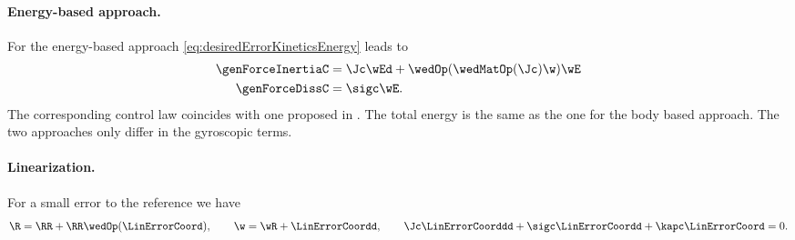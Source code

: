 \paragraph{Energy-based approach.}
For the energy-based approach \eqref{eq:desiredErrorKineticsEnergy} leads to
\begin{subequations}
\begin{align}
 \genForceInertiaC &= \Jc \wEd + \wedOp(\wedMatOp(\Jc) \w) \wE
\\
 \genForceDissC &= \sigc \wE.
\end{align} 
\end{subequations}
The corresponding control law coincides with one proposed in \cite{Bullo:TrackingAutomatica}.
The total energy is the same as the one for the body based approach.
The two approaches only differ in the gyroscopic terms.



\paragraph{Linearization.}
For a small error to the reference we have
\begin{align}
 \R = \RR + \RR \wedOp(\LinErrorCoord),
\qquad
 \w = \wR + \LinErrorCoordd,
\qquad
 \Jc \LinErrorCoorddd + \sigc \LinErrorCoordd + \kapc \LinErrorCoord = 0.
\end{align}
